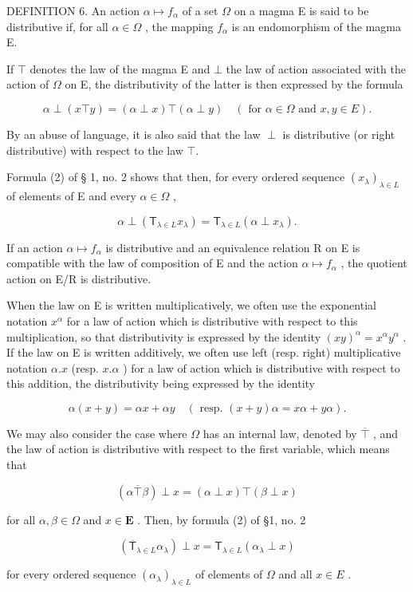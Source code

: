 DEFINITION 6. An action \(\alpha \mapsto f_{\alpha}\) of a set \(\Omega\) on a magma E is said to be distributive if, for all \(\alpha \in \Omega\) , the mapping \(f_{\alpha}\) is an endomorphism of the magma E.

If \(\top\) denotes the law of the magma E and \(\bot\) the law of action associated with the action of \(\Omega\) on E, the distributivity of the latter is then expressed by the formula

\[
\alpha \perp (x \top y) = (\alpha \perp x) \top (\alpha \perp y) \quad (\text { for   } \alpha \in \Omega \text {   and   } x, y \in E).\tag{6}
\]

By an abuse of language, it is also said that the law \(\perp\) is distributive (or right distributive) with respect to the law \(\top\).

Formula (2) of § 1, no. 2 shows that then, for every ordered sequence \((x_{\lambda})_{\lambda \in L}\) of elements of E and every \(\alpha \in \Omega\) ,

\[
\alpha \perp \left(\mathsf {T} _ {\lambda \in L} x _ {\lambda}\right) = \mathsf {T} _ {\lambda \in L} (\alpha \perp x _ {\lambda}).\tag{7}
\]

If an action \(\alpha\mapsto f_{\alpha}\) is distributive and an equivalence relation R on E is compatible with the law of composition of E and the action \(\alpha\mapsto f_{\alpha}\) , the quotient action on E/R is distributive.

When the law on E is written multiplicatively, we often use the exponential notation \(x^{\alpha}\) for a law of action which is distributive with respect to this multiplication, so that distributivity is expressed by the identity \((xy)^{\alpha} = x^{\alpha}y^{\alpha}\) . If the law on E is written additively, we often use left (resp. right) multiplicative notation \(\alpha.x\) (resp. \(x.\alpha\) ) for a law of action which is distributive with respect to this addition, the distributivity being expressed by the identity

\[
\alpha (x + y) = \alpha x + \alpha y \quad (\text { resp. } (x + y) \alpha = x \alpha + y \alpha).
\]

We may also consider the case where \(\Omega\) has an internal law, denoted by \(\overline{\top}\) , and the law of action is distributive with respect to the first variable, which means that

\[
(\alpha \overline{\top} \beta) \perp x = (\alpha \perp x) \top (\beta \perp x)\tag{8}
\]

for all \(\alpha, \beta \in \Omega\) and \(x \in \mathbf{E}\) . Then, by formula (2) of §1, no. 2

\[
\left(\overline {{\mathsf {T}}} _ {\lambda \in L} \alpha_ {\lambda}\right) \perp x = \mathsf {T} _ {\lambda \in L} (\alpha_ {\lambda} \perp x)\tag{9}
\]

for every ordered sequence \((\alpha_{\lambda})_{\lambda \in L}\) of elements of \(\Omega\) and all \(x\in E\) .

